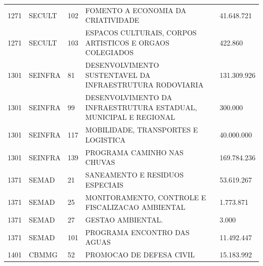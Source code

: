 \documentclass{article}
\begin{document}
\begin{longtable}[c]{m{1cm}|m{1.5cm}|m{1cm}m{10cm}|m{2cm}}
\multicolumn{1}{C{1cm}|}{1271} & \multicolumn{1}{L{1.5cm}|}{SECULT} & \multicolumn{1}{C{1cm}|}{102} & \multicolumn{1}{L{10cm}|}{FOMENTO A ECONOMIA DA CRIATIVIDADE} & \multicolumn{1}{R{2cm}}{41.648.721} \\
\multicolumn{1}{C{1cm}|}{1271} & \multicolumn{1}{L{1.5cm}|}{SECULT} & \multicolumn{1}{C{1cm}|}{103} & \multicolumn{1}{L{10cm}|}{ESPACOS CULTURAIS, CORPOS ARTISTICOS E ORGAOS COLEGIADOS} & \multicolumn{1}{R{2cm}}{422.860} \\
\multicolumn{1}{C{1cm}|}{1301} & \multicolumn{1}{L{1.5cm}|}{SEINFRA} & \multicolumn{1}{C{1cm}|}{81} & \multicolumn{1}{L{10cm}|}{DESENVOLVIMENTO SUSTENTAVEL DA INFRAESTRUTURA RODOVIARIA} & \multicolumn{1}{R{2cm}}{131.309.926} \\
\multicolumn{1}{C{1cm}|}{1301} & \multicolumn{1}{L{1.5cm}|}{SEINFRA} & \multicolumn{1}{C{1cm}|}{99} & \multicolumn{1}{L{10cm}|}{DESENVOLVIMENTO DA INFRAESTRUTURA ESTADUAL, MUNICIPAL E REGIONAL} & \multicolumn{1}{R{2cm}}{300.000} \\
\multicolumn{1}{C{1cm}|}{1301} & \multicolumn{1}{L{1.5cm}|}{SEINFRA} & \multicolumn{1}{C{1cm}|}{117} & \multicolumn{1}{L{10cm}|}{MOBILIDADE, TRANSPORTES E LOGISTICA} & \multicolumn{1}{R{2cm}}{40.000.000} \\
\multicolumn{1}{C{1cm}|}{1301} & \multicolumn{1}{L{1.5cm}|}{SEINFRA} & \multicolumn{1}{C{1cm}|}{139} & \multicolumn{1}{L{10cm}|}{PROGRAMA CAMINHO NAS CHUVAS} & \multicolumn{1}{R{2cm}}{169.784.236} \\
\multicolumn{1}{C{1cm}|}{1371} & \multicolumn{1}{L{1.5cm}|}{SEMAD} & \multicolumn{1}{C{1cm}|}{21} & \multicolumn{1}{L{10cm}|}{SANEAMENTO E RESIDUOS ESPECIAIS} & \multicolumn{1}{R{2cm}}{53.619.267} \\
\multicolumn{1}{C{1cm}|}{1371} & \multicolumn{1}{L{1.5cm}|}{SEMAD} & \multicolumn{1}{C{1cm}|}{25} & \multicolumn{1}{L{10cm}|}{MONITORAMENTO, CONTROLE E FISCALIZACAO AMBIENTAL} & \multicolumn{1}{R{2cm}}{1.773.871} \\
\multicolumn{1}{C{1cm}|}{1371} & \multicolumn{1}{L{1.5cm}|}{SEMAD} & \multicolumn{1}{C{1cm}|}{27} & \multicolumn{1}{L{10cm}|}{GESTAO AMBIENTAL.} & \multicolumn{1}{R{2cm}}{3.000} \\
\multicolumn{1}{C{1cm}|}{1371} & \multicolumn{1}{L{1.5cm}|}{SEMAD} & \multicolumn{1}{C{1cm}|}{101} & \multicolumn{1}{L{10cm}|}{PROGRAMA ENCONTRO DAS AGUAS} & \multicolumn{1}{R{2cm}}{11.492.447} \\
\multicolumn{1}{C{1cm}|}{1401} & \multicolumn{1}{L{1.5cm}|}{CBMMG} & \multicolumn{1}{C{1cm}|}{52} & \multicolumn{1}{L{10cm}|}{PROMOCAO DE DEFESA CIVIL} & \multicolumn{1}{R{2cm}}{15.183.992} \\

\end{longtable}
\end{document}
